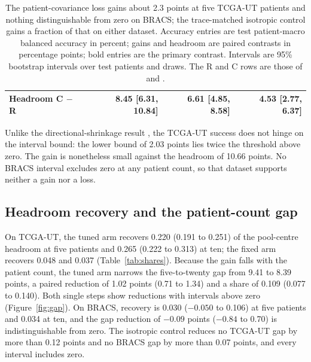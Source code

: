 \begin{table}[htbp]
\begin{tabular}{@{}lrrr@{}}
Headroom C $-$ R & 8.45 [6.31, 10.84] & 6.61 [4.85, 8.58] & 4.53 [2.77, 6.37] \\
\bottomrule
\end{tabular}
\caption{The patient-covariance loss gains about 2.3 points at five TCGA-UT patients and nothing distinguishable from zero on BRACS; the trace-matched isotropic control gains a fraction of that on either dataset. Accuracy entries are test patient-macro balanced accuracy in percent; gains and headroom are paired contrasts in percentage points; bold entries are the primary contrast. Intervals are 95\% bootstrap intervals over test patients and draws. The R and C rows are those of \citet{queisler2026centreError} and \citet{queisler2026bracsMechanism}.}
\label{tab:accuracy}
\end{table}

\noindent Unlike the directional-shrinkage result \citep{queisler2026directionalShrinkage}, the TCGA-UT success does not hinge on the interval bound: the lower bound of 2.03 points lies twice the threshold above zero. The gain is nonetheless small against the headroom of 10.66 points. No BRACS interval excludes zero at any patient count, so that dataset supports neither a gain nor a loss.

\subsection{Headroom recovery and the patient-count gap}
\label{sec:recovery-results}
On TCGA-UT, the tuned arm recovers 0.220 (0.191 to 0.251) of the pool-centre headroom at five patients and 0.265 (0.222 to 0.313) at ten; the fixed arm recovers 0.048 and 0.037 (Table~\ref{tab:shares}). Because the gain falls with the patient count, the tuned arm narrows the five-to-twenty gap from 9.41 to 8.39 points, a paired reduction of 1.02 points (0.71 to 1.34) and a share of 0.109 (0.077 to 0.140). Both single steps show reductions with intervals above zero (Figure~\ref{fig:gap}). On BRACS, recovery is 0.030 ($-0.050$ to 0.106) at five patients and 0.034 at ten, and the gap reduction of $-0.09$ points ($-0.84$ to 0.70) is indistinguishable from zero. The isotropic control reduces no TCGA-UT gap by more than 0.12 points and no BRACS gap by more than 0.07 points, and every interval includes zero.

